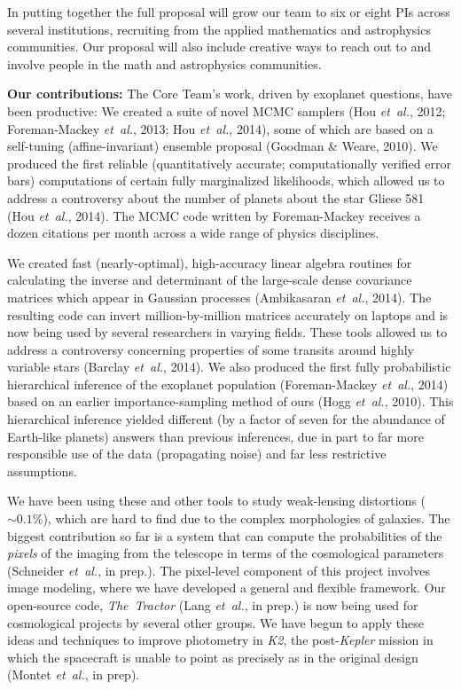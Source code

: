 \documentclass[11pt]{article}
\newcommand{\foreign}[1]{\textsl{#1}}
\newcommand{\etal}{\foreign{et~al.}}
\newcommand{\project}[1]{\textsl{#1}}
\renewcommand{\paragraph}[1]{\smallskip\par\noindent\textbf{{#1}:}}
\begin{document}
In putting together the full proposal will grow our team to six or eight PIs across several institutions, 
recruiting from the applied mathematics and astrophysics communities.
Our proposal will also include creative ways to reach out to and involve people in
the math and astrophysics communities.

\paragraph{Our contributions}
The Core Team's work, driven by exoplanet questions,
have been productive:
We created a suite of novel MCMC samplers 
(Hou \etal, 2012; Foreman-Mackey \etal, 2013; Hou \etal,
2014), some of which are based on a self-tuning (affine-invariant)
ensemble proposal (Goodman \& Weare, 2010).
We produced the first reliable (quantitatively accurate; computationally 
verified error bars) computations of certain fully
marginalized likelihoods, which allowed us to address a controversy
about the number of planets about the star Gliese 581 (Hou \etal, 2014).
The MCMC code written by Foreman-Mackey receives a dozen
citations per month across a wide range of physics disciplines.

We created fast (nearly-optimal), high-accuracy linear algebra
routines for calculating the inverse and determinant of the large-scale
dense covariance matrices which appear in Gaussian processes
(Ambikasaran \etal, 2014).
The resulting code can invert million-by-million matrices
accurately on laptops and is now being used by
several researchers in varying fields.
These tools allowed us to address a controversy concerning properties 
of some transits around highly variable stars (Barclay \etal, 2014).
We also produced the first fully probabilistic hierarchical inference of
the exoplanet population (Foreman-Mackey \etal, 2014) based on an
earlier importance-sampling method of ours (Hogg \etal, 2010).
This hierarchical inference yielded different (by a factor of seven for
the abundance of Earth-like planets) answers than previous inferences,
due in part to far more responsible use of the data (propagating noise)
and far less restrictive assumptions.

We have been using these and other tools to study
weak-lensing distortions ($\sim 0.1\%$), which are hard to find
due to the complex morphologies of galaxies.
The biggest contribution so far is a system
that can compute the probabilities of the \emph{pixels} of the
imaging from the telescope in terms of the cosmological parameters
(Schneider \etal, in prep.).
The pixel-level component of this project involves image modeling,
where we have developed a general and flexible framework.
Our open-source code, \project{The~Tractor} (Lang \etal,
in prep.) is now being used for cosmological projects by several other groups.
We have begun to apply these ideas and techniques to 
improve photometry in \project{K2}, the
post-\project{Kepler} mission in which the spacecraft is unable to point
as precisely as in the original design (Montet \etal, in prep).
\end{document}

